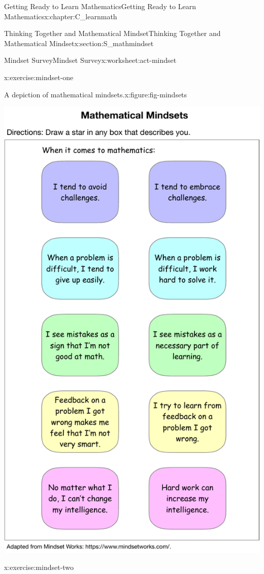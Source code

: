 \documentclass[oneside,10pt,]{book}
\numberwithin{equation}{chapter}
\begin{document}
\begin{chapterptx}{Getting Ready to Learn Mathematics}{}{Getting Ready to Learn Mathematics}{}{}{x:chapter:C_learnmath}
\begin{sectionptx}{Thinking Together and Mathematical Mindset}{}{Thinking Together and Mathematical Mindset}{}{}{x:section:S_mathmindset}
\begin{worksheet-subsection}{Mindset Survey}{}{Mindset Survey}{}{}{x:worksheet:act-mindset}
\begin{divisionexercise}{1}{}{}{x:exercise:mindset-one}
\begin{figureptx}{A depiction of mathematical mindsets.}{x:figure:fig-mindsets}{}
\begin{image}{0.25}{0.5}{0.25}
\includegraphics[width=\linewidth]{external/mindsets.pdf}
\end{image}%
\tcblower
\end{figureptx}%
\end{divisionexercise}%
\begin{divisionexercise}{2}{}{}{x:exercise:mindset-two}%
\begin{enumerate}[font=\bfseries,label=(\alph*),ref=\alph*]

\end{enumerate}
\end{divisionexercise}
\end{worksheet-subsection}
\end{sectionptx}
\end{chapterptx}
\end{document}
